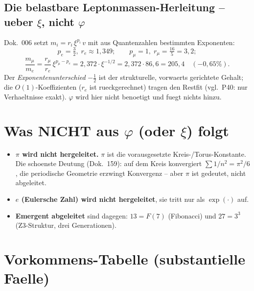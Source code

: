 \subsection{Die belastbare Leptonmassen-Herleitung -- ueber $\xi$, nicht
$\varphi$}\label{sec:masse}
Dok.~006 setzt $m_i = r_i\,\xi^{p_i}\,v$ mit aus Quantenzahlen bestimmten
Exponenten:
\begin{equation}
  p_e = \tfrac32,\; r_e\approx 1{,}349; \qquad
  p_\mu = 1,\; r_\mu = \tfrac{16}{5} = 3{,}2;
\end{equation}
\begin{equation}
  \frac{m_\mu}{m_e} = \frac{r_\mu}{r_e}\,\xi^{p_\mu-p_e}
  = 2{,}372\cdot\xi^{-1/2} = 2{,}372\cdot86{,}6 = 205{,}4 \quad(-0{,}65\%).
\end{equation}
Der \emph{Exponentenunterschied} $-\tfrac12$ ist der strukturelle, vorwaerts
gerichtete Gehalt; die $O(1)$-Koeffizienten ($r_e$ ist rueckgerechnet) tragen
den Restfit (vgl.\ P40: nur Verhaeltnisse exakt). $\varphi$ wird hier nicht
benoetigt und fuegt nichts hinzu.

\section{Was NICHT aus $\varphi$ (oder $\xi$) folgt}

\begin{itemize}
  \item \textbf{$\pi$ wird nicht hergeleitet.} $\pi$ ist die vorausgesetzte
        Kreis-/Torus-Konstante. Die schoenste Deutung (Dok.~159): auf dem Kreis
        konvergiert $\sum 1/n^2=\pi^2/6$, die periodische Geometrie erzwingt
        Konvergenz -- aber $\pi$ ist gedeutet, nicht abgeleitet.
  \item \textbf{$e$ (Eulersche Zahl) wird nicht hergeleitet}, sie tritt nur als
        $\exp(\cdot)$ auf.
  \item \textbf{Emergent abgeleitet} sind dagegen: $13=F(7)$ (Fibonacci) und
        $27=3^3$ (Z3-Struktur, drei Generationen).
\end{itemize}

\section{Vorkommens-Tabelle (substantielle Faelle)}

